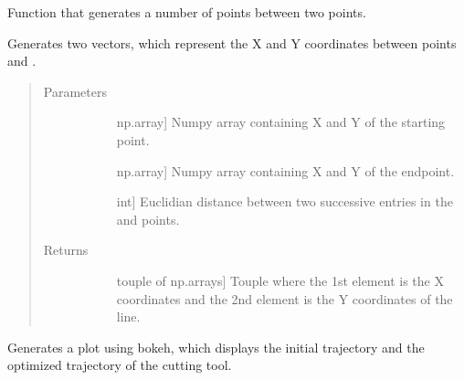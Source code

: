 \documentclass[letterpaper,10pt,english,openany,oneside]{sphinxmanual}
\begin{document}
\begin{fulllineitems}
\begin{fulllineitems}
\end{fulllineitems}


\begin{fulllineitems}
\label{\detokenize{reference:cnc.visualization.Visualizer.split_line}}
Function that generates a number of points between two points.

Generates two vectors, which represent the X and Y coordinates between
points  and .
\begin{quote}\begin{description}
\item[{Parameters}] \leavevmode\begin{description}
\item[{}] \leavevmode{[}np.array{]}
Numpy array containing X and Y of the starting point.

\item[{}] \leavevmode{[}np.array{]}
Numpy array containing X and Y of the endpoint.

\item[{}] \leavevmode{[}int{]}
Euclidian distance between two successive entries in the 
and  points.

\end{description}

\item[{Returns}] \leavevmode\begin{description}
\item[{}] \leavevmode{[}touple of np.arrays{]}
Touple where the 1st element is the X coordinates and the 2nd
element is the Y coordinates of the line.

\end{description}

\end{description}\end{quote}

\end{fulllineitems}


\begin{fulllineitems}
\label{\detokenize{reference:cnc.visualization.Visualizer.visualize}}
Generates a plot using bokeh, which displays the initial trajectory and
the optimized trajectory of the cutting tool.

\end{fulllineitems}


\end{fulllineitems}
\end{document}
